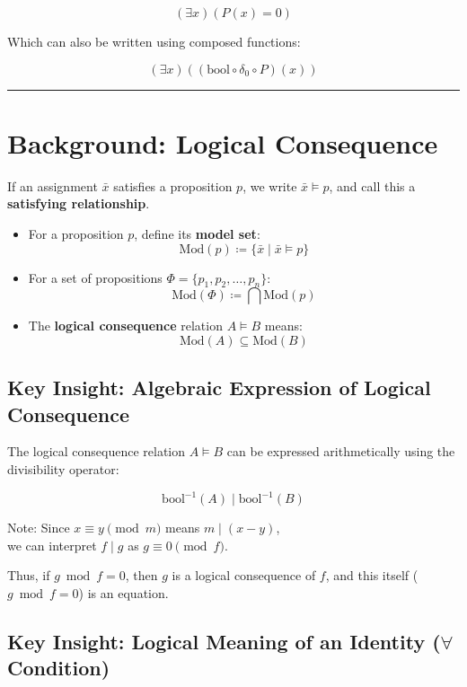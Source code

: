 \documentclass{article}
\begin{document}
\[
(\exists x)(P(x) = 0)
\]

Which can also be written using composed functions:

\[
(\exists x)((\mathrm{bool} \circ \delta_0 \circ P)(x))
\]

\bigskip
\hrule
\bigskip

\section*{Background: Logical Consequence}

If an assignment $\bar{x}$ satisfies a proposition $p$, we write $\bar{x} \vDash p$, and call this a \textbf{satisfying relationship}.

\begin{itemize}
    \item For a proposition $p$, define its \textbf{model set}:
    \[
    \mathrm{Mod}(p) \coloneqq \{\bar{x} \mid \bar{x} \vDash p \}
    \]
    \item For a set of propositions $\Phi = \{p_1, p_2, \ldots, p_n \}$:
    \[
    \mathrm{Mod}(\Phi) \coloneqq \bigcap \mathrm{Mod}(p)
    \]
    \item The \textbf{logical consequence} relation $A \vDash B$ means:
    \[
    \mathrm{Mod}(A) \subseteq \mathrm{Mod}(B)
    \]
\end{itemize}

\bigskip

\subsection*{Key Insight: Algebraic Expression of Logical Consequence}

The logical consequence relation $A \vDash B$ can be expressed arithmetically using the divisibility operator:

\[
\mathrm{bool}^{-1}(A) \mid \mathrm{bool}^{-1}(B)
\]

Note: Since $x \equiv y \pmod{m}$ means $m \mid (x - y)$,\\
we can interpret $f \mid g$ as $g \equiv 0 \pmod{f}$.

Thus, if $g \bmod f = 0$, then $g$ is a logical consequence of $f$, and this itself ($g \bmod f = 0$) is an equation.

\bigskip

\subsection*{Key Insight: Logical Meaning of an Identity ($\forall$ Condition)}
\end{document}
